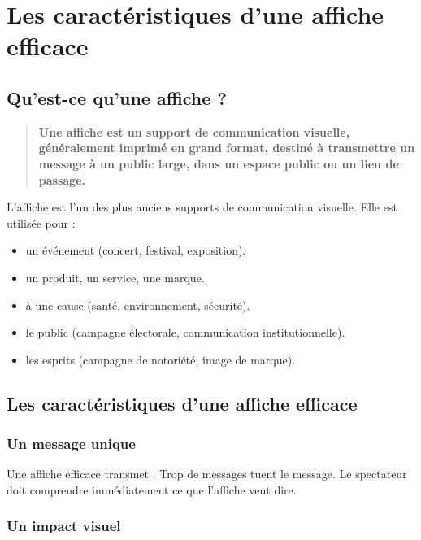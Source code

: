 \section{Les caractéristiques d'une affiche efficace}

\subsection{Qu'est-ce qu'une affiche ?}

\begin{quote}
\textbf{Une affiche est un support de communication visuelle, généralement imprimé en grand format, destiné à transmettre un message à un public large, dans un espace public ou un lieu de passage.}
\end{quote}

L'affiche est l'un des plus anciens supports de communication visuelle. Elle est utilisée pour :

\begin{itemize}
    \item {} un événement (concert, festival, exposition).
    \item {} un produit, un service, une marque.
    \item {} à une cause (santé, environnement, sécurité).
    \item {} le public (campagne électorale, communication institutionnelle).
    \item {} les esprits (campagne de notoriété, image de marque).
\end{itemize}

\subsection{Les caractéristiques d'une affiche efficace}

\subsubsection{Un message unique}

Une affiche efficace transmet . Trop de messages tuent le message. Le spectateur doit comprendre immédiatement ce que l'affiche veut dire.

\subsubsection{Un impact visuel}

